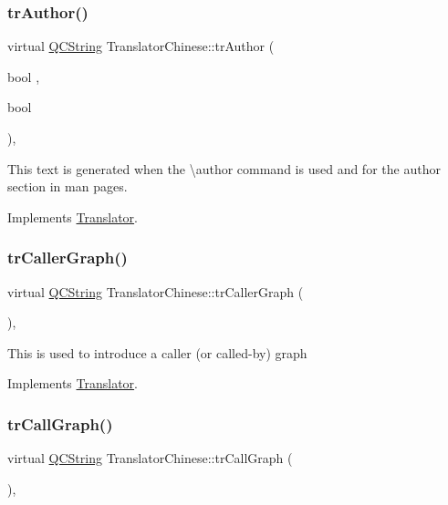\subsubsection{\texorpdfstring{trAuthor()}{trAuthor()}}
{\footnotesize\ttfamily virtual \mbox{\hyperlink{class_q_c_string}{Q\+C\+String}} Translator\+Chinese\+::tr\+Author (\begin{DoxyParamCaption}\item[{bool}]{,  }\item[{bool}]{ }\end{DoxyParamCaption})\hspace{0.3cm}{\ttfamily [inline]}, {\ttfamily [virtual]}}

This text is generated when the \textbackslash{}author command is used and for the author section in man pages. 

Implements \mbox{\hyperlink{class_translator}{Translator}}.

\mbox{\label{class_translator_chinese_a327d79d0d375dd73eab9cbbabccb5b56}} 
\subsubsection{\texorpdfstring{trCallerGraph()}{trCallerGraph()}}
{\footnotesize\ttfamily virtual \mbox{\hyperlink{class_q_c_string}{Q\+C\+String}} Translator\+Chinese\+::tr\+Caller\+Graph (\begin{DoxyParamCaption}{ }\end{DoxyParamCaption})\hspace{0.3cm}{\ttfamily [inline]}, {\ttfamily [virtual]}}

This is used to introduce a caller (or called-\/by) graph 

Implements \mbox{\hyperlink{class_translator}{Translator}}.

\mbox{\label{class_translator_chinese_a3172cf3eaa766ff2474ccd25cada88da}} 
\subsubsection{\texorpdfstring{trCallGraph()}{trCallGraph()}}
{\footnotesize\ttfamily virtual \mbox{\hyperlink{class_q_c_string}{Q\+C\+String}} Translator\+Chinese\+::tr\+Call\+Graph (\begin{DoxyParamCaption}{ }\end{DoxyParamCaption})\hspace{0.3cm}{\ttfamily [inline]}, {\ttfamily [virtual]}}

